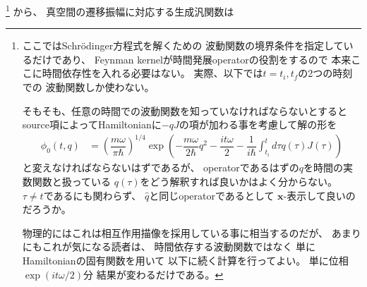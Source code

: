 \footnote{
    ここではSchr\"odinger方程式を解くための
    波動関数の境界条件を指定しているだけであり、
    Feynman kernelが時間発展operatorの役割をするので
    本来ここに時間依存性を入れる必要はない。
    実際、以下では$t = t_i, t_f$の2つの時刻での
    波動関数しか使わない。

    そもそも、任意の時間での波動関数を知っていなければならないとすると
    source項によってHamiltonianに$-qJ$の項が加わる事を考慮して解の形を
    \begin{align}
        \phi_0  (t, q)
        &=
        \left(
            \dfrac{m \omega}{\pi \hbar}        
        \right)^{1/4}
        \exp(
            - \dfrac{m \omega}{2 \hbar} q^2
            -
            \dfrac{i t \omega}{2}
        -
            \dfrac{1}{i \hbar}
            \int_{t_i}^t d\tau
            q(\tau)
            J(\tau)
        )
    \end{align}
    と変えなければならないはずであるが、
    operatorであるはずの$q$を時間の実数関数と扱っている
    $q(\tau)$をどう解釈すれば良いかはよく分からない。
    $\tau \neq t$であるにも関わらず、
    $\hat{q}$と同じoperatorであるとして
    $\bm{x}$-表示して良いのだろうか。

    物理的にはこれは相互作用描像を採用している事に相当するのだが、
    あまりにもこれが気になる読者は、
    時間依存する波動関数ではなく
    単にHamiltonianの固有関数を用いて
    以下に続く計算を行ってよい。
    単に位相$\exp(i t \omega / 2)$分
    結果が変わるだけである。
}
から、
真空間の遷移振幅に対応する生成汎関数は

